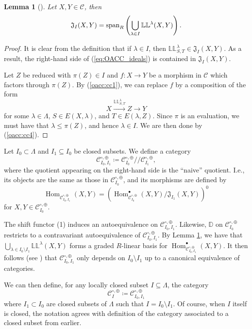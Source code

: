 \documentclass{amsart}
\newcommand{\scrC}{\mathcal{C}}
\DeclareMathOperator{\Hom}{Hom}
\newcommand{\DD}{\mathbb{D}}
\newcommand{\dLL}{\mathbb{L}\mathbb{L}}
\newcommand{\naivequotient}{/\!\!/}
\newtheorem{lemma}[subsubsection]{Lemma}
\theoremstyle{definition}
\numberwithin{equation}{subsection}
\begin{document}
\begin{lemma}[{\cite[Lemma 4.2]{ARV}}]\label{lem:OACC_ideals}
    Let $X,Y \in \scrC$, then
    \begin{equation}\label{eq:OACC_ideals}
        \mathfrak{J}_{I} (X,Y) = \textnormal{span}_R \left( \bigcup_{\lambda \in I} \dLL^{\lambda} (X,Y) \right).
    \end{equation}
\end{lemma}
\begin{proof}
    It is clear from the definition that if $\lambda \in I$, then $\dLL_{S,T}^{\lambda} \in \mathfrak{J}_{I} (X,Y)$. As a result, the right-hand side of (\ref{eq:OACC_ideals}) is contained in $\mathfrak{J}_{I} (X,Y)$.
    
    Let $Z$ be reduced with $\pi (Z) \in I$ and $f : X \to Y$ be a morphism in $\scrC$ which factors through $\pi (Z)$.
    By (\ref{oacc:cc1}), we can replace $f$ by a composition of the form
    \[X \stackrel{\dLL_{S,T}^{\lambda}}{\longrightarrow} Z \to Y\]
    for some $\lambda \in \Lambda$, $S \in E(X, \lambda)$, and $T \in E(\lambda, Z)$. 
    Since $\pi$ is an evaluation, we must have that $\lambda \leq \pi (Z)$, and hence $\lambda \in I$. We are then done by (\ref{oacc:cc4}).
\end{proof}

Let $I_0 \subset \Lambda$ and $I_1 \subseteq I_0$ be closed subsets.
We define a category
\[\scrC_{I_0, I_1}^{\circ, \oplus} \coloneq \scrC_{I_0}^{\circ, \oplus} \naivequotient \scrC_{I_1}^{\circ, \oplus},\]
where the quotient appearing on the right-hand side is the ``naive'' quotient. I.e., its objects are the same as those in $\scrC_{I_0}^{\circ, \oplus}$, and its morphisms are defined by
\[\Hom_{\scrC_{I_0, I_1}^{\circ, \oplus}} (X,Y) = \left( \Hom_{\scrC_{I_0}^{\circ, \oplus}}^{\bullet} (X,Y) / \mathfrak{J}_{I_1} (X,Y) \right)^0\]
for $X,Y \in \scrC_{I_0}^{\circ, \oplus}$.

The shift functor (1) induces an autoequivalence on $\scrC_{I_0, I_1}^{\circ, \oplus}$. Likewise, $\DD$ on $\scrC_{I_0}^{\circ, \oplus}$ restricts to a contravariant autoequivalence of $\scrC_{I_0, I_1}^{\circ, \oplus}$. 
By Lemma \ref{lem:OACC_ideals}, we have that $\bigcup_{\lambda \in I_0 \setminus I_1} \dLL^{\lambda} (X,Y)$ forms a graded $R$-linear basis for $\Hom_{\scrC_{I_0, I_1}^{\circ, \oplus}}^{\bullet} (X,Y)$.
It then follows (see \cite[Lemma 4.3]{ARV}) that $\scrC_{I_0, I_1}^{\circ, \oplus}$ only depends on $I_0 \setminus I_1$ up to a canonical equivalence of categories.

We can then define, for any locally closed subset $I \subseteq \Lambda$, the category 
\[\scrC_{I}^{\circ, \oplus} \coloneq \scrC_{I_0, I_1}^{\circ, \oplus}\]
where $I_1 \subset I_0$ are closed subsets of $\Lambda$ such that $I = I_0 \setminus I_1$. Of course, when $I$ itself is closed, the notation agrees with definition of the category associated to a closed subset from earlier.
\end{document}
